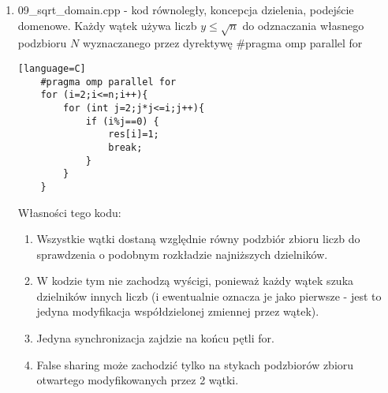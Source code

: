 \documentclass[12pt]{article}
\begin{document}
\begin {enumerate}
\begin{lstlisting}[style=mystyle, caption= Sito funkcyjne z dynamic schedulingiem][language=C]
		for (i=2;i<=n;i++){
			for (j=v1;j*j<=i && j<=v2;j++){
				if (i%j==0) {
				res[i]=1;
				break;
			}
		}
	}
	\end{lstlisting}
	Własności tego kodu:
	\begin{enumerate}
		\item Wszystkie wątki dostaną względnie równy zbiór liczb pierwszych do sprawdzenia - to wynika ze sposobu wyznaczenia lewego i prawego końca przedziału
		\item W kodzie tym nie zachodzą wyścigi, bo wyznaczanie dzielnika w 1 wątku i ewentualne oznaczenie liczby jako złożona jest niezależne od działania innych wątków.
		\item Jedyna synchronizacja zajdzie na końcu pętli for.
		\item False sharing może zajść dla całej tablicy liczb pierwszych, ponieważ wątki ją modyfikują niezależnie od siebie.
	\end{enumerate}
	Fundamentalnym problemem algorytmu jest nonsensowny algorytm - każda liczba jest dzielona przez liczby do pierwiastka z niej niezależnie od tego, czy znalazłem jej dzielnik w innym wątku. To zapewnia mniejszy narzut związany z synchronizacją, jednocześnie generując problemy związane z nieefektywnością.
	
	\item 09\_sqrt\_domain.cpp - kod równoległy, koncepcja dzielenia, podejście domenowe. Każdy wątek używa liczb \(y\le\sqrt{n}\) do odznaczania własnego podzbioru \(N\) wyznaczanego przez dyrektywę \#pragma omp parallel for
	\begin{lstlisting}[style=mystyle, caption= Sito funkcyjne z dynamic schedulingiem][language=C]
	#pragma omp parallel for
	for (i=2;i<=n;i++){
		for (int j=2;j*j<=i;j++){
			if (i%j==0) {
				res[i]=1;
				break;
			}
		}
	}
	\end{lstlisting}
	Własności tego kodu:
	\begin{enumerate}
		\item Wszystkie wątki dostaną względnie równy podzbiór zbioru liczb do sprawdzenia o podobnym rozkładzie najniższych dzielników.
		\item W kodzie tym nie zachodzą wyścigi, ponieważ każdy wątek szuka dzielników innych liczb (i ewentualnie oznacza je jako pierwsze - jest to jedyna modyfikacja współdzielonej zmiennej przez wątek).
		\item Jedyna synchronizacja zajdzie na końcu pętli for.
		\item False sharing może zachodzić tylko na stykach podzbiorów zbioru otwartego modyfikowanych przez 2 wątki.
	\end{enumerate}
\end {enumerate}
\end{document}

